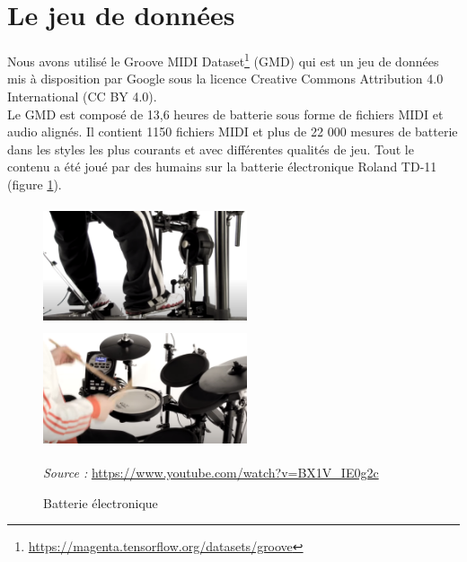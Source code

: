 \section{Le jeu de données}
Nous avons utilisé le Groove MIDI
Dataset\footnote{\url{https://magenta.tensorflow.org/datasets/groove}}
\cite{groove2019} (GMD) qui est un jeu de données mis à disposition par Google
sous la licence Creative Commons Attribution 4.0 International (CC BY 4.0).\\
Le GMD est composé de 13,6 heures de batterie sous forme de fichiers MIDI et
audio alignés. Il contient 1150 fichiers MIDI et plus de 22 000 mesures de
batterie dans les styles les plus courants et avec différentes qualités de jeu.
Tout le contenu a été joué par des humains sur la batterie électronique Roland
TD-11 (figure \ref{electro_drums}).
\begin{figure}[h]
	\centering
	\includegraphics[height=35mm, width=60mm]
    {z_images/4_experimentations/0_groove/0_roland.png}\ \ 
	\includegraphics[height=35mm, width=60mm]
    {z_images/4_experimentations/0_groove/1_roland.png}
	\caption{Batterie électronique}
	\label{electro_drums}
	\textit{Source :} \url{https://www.youtube.com/watch?v=BX1V_IE0g2c}
\end{figure}

